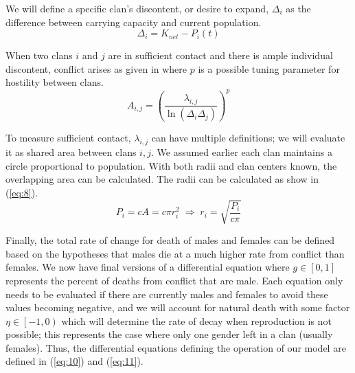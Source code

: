 \documentclass[letterpaper, 9pt, conference]{ieeeconf}  %
\begin{document}
We will define a specific clan's discontent, or desire to expand, $\Delta_i$ as the difference between carrying capacity and current population.
\begin{equation}
    \Delta_i = K_{net} - P_i(t) \label{eq:6}
\end{equation}

When two clans $i$ and $j$ are in sufficient contact and there is ample individual discontent, conflict arises as given in \label{eq:7} where $p$ is a possible tuning parameter for hostility between clans.
\begin{equation}
    A_{i, j} = \left(\frac{\lambda_{i, j}}{\ln(\Delta_i\Delta_j)}\right)^p \label{eq:7}
\end{equation}

To measure sufficient contact, $\lambda_{i, j}$ can have multiple definitions; we will evaluate it as shared area between clans $i, j$. We assumed earlier each clan maintains a circle proportional to population. With both radii and clan centers known, the overlapping area can be calculated.
 \cite{circle_area} The radii can be calculated as show in (\ref{eq:8}).
\begin{equation}
    P_i = cA = c \pi r_i^2 \; \Rightarrow \; r_i = \sqrt{\dfrac{P_i}{c\pi}} \label{eq:8}
\end{equation}

Finally, the total rate of change for death of males and females can be defined based on the hypotheses that males die at a much higher rate from conflict than females. We now have final versions of a differential equation where $g \in [0,1] $ represents the percent of deaths from conflict that are male. Each equation only needs to be evaluated if there are currently males and females to avoid these values becoming negative, and we will account for natural death with some factor $\eta \in \left[-1, 0\right)$ which will determine the rate of decay when reproduction is not possible; this represents the case where only one gender left in a clan (usually females). Thus, the differential equations defining the operation of our model are defined in (\ref{eq:10}) and (\ref{eq:11}).
\end{document}
